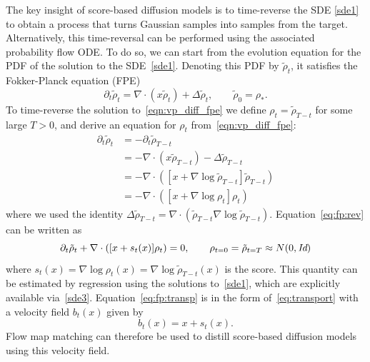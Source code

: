 The key insight of score-based diffusion models is to time-reverse the SDE \eqref{sde1} to obtain a process that turns Gaussian samples into samples from the target.
%
Alternatively, this time-reversal can be performed using the associated probability flow ODE.
To do so, we can start from the evolution equation for the PDF of the solution to the SDE~\eqref{sde1}. Denoting this PDF by $\tilde \rho_t$,  it satisfies the Fokker-Planck equation (FPE)
\begin{equation}
	\label{eqn:vp_diff_fpe}
	\partial_t \tilde\rho_t = \nabla\cdot(x\tilde\rho_t) +\Delta\tilde\rho_t, \qquad \tilde \rho_0 = \rho_*.
\end{equation}
%
To time-reverse the solution to~\eqref{eqn:vp_diff_fpe} we define $\rho_t = \tilde \rho_{T-t}$ for some large $T>0$, and derive an equation for $\rho_t$ from~\eqref{eqn:vp_diff_fpe}:
\begin{equation}
	\begin{aligned}
		\partial_t \tilde\rho_t & = -\partial_t \tilde \rho_{T-t}                                       \\
		                        & = - \nabla\cdot(x \tilde\rho_{T-t}) - \Delta \tilde \rho_{T-t}        \\
		                        & = - \nabla\cdot([x + \nabla \log \tilde \rho_{T-t} ]\tilde\rho_{T-t}) \\
		                        & = - \nabla\cdot([x + \nabla \log \rho_{t} ]\rho_{t})
		\label{eq:fp:rev}
	\end{aligned}
\end{equation}
where we used the identity $\Delta  \tilde \rho_{T-t} = \nabla \cdot( \tilde \rho_{T-t} \nabla \log \tilde \rho_{T-t})$. Equation~\eqref{eq:fp:rev} can be written as
\begin{equation}
	\partial_t \tilde\rho_t + \nabla\cdot([x + s_t(x)] \rho_t) =0, \qquad \rho_{t=0} = \tilde \rho_{t=T} \approx N(0,\text{\it Id})
	\label{eq:fp:transp}
\end{equation}
where $s_t(x) = \nabla \log \rho_t(x) = \nabla \log \tilde \rho_{T-t}(x)$ is the score.
%
This quantity can be estimated by regression using the solutions to~\eqref{sde1}, which are explicitly available via~\eqref{sde3}.
%
Equation~\eqref{eq:fp:transp} is in the form of~\eqref{eq:transport} with a velocity field $b_t(x)$ given by
\begin{equation}
	\label{eq:pflow:sb}
	b_t(x) = x + s_t(x).
\end{equation}
%
Flow map matching can therefore be used to distill score-based diffusion models using this velocity field.

